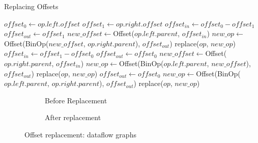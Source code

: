 \renewcommand\theFancyVerbLine{\arabic{FancyVerbLine}}
\begin{algorithm}[H]
\caption{Replacing Offsets}\label{optimisation.replacing_offset}
\begin{algorithmic}[1]
\State $offset_0 \gets op.left.offset$
\State $offset_1 \gets op.right.offset$
\State $offset_{in} \gets offset_0 - offset_1$
\State $offset_{out} \gets offset_1$
\State $new\_offset \gets $Offset($op.left.parent$, $offset_{in}$)
\State $new\_op \gets $Offset(BinOp($new\_offset$, $op.right.parent$), $offset_{out}$)
\State replace($op$, $new\_op$)
\State $offset_{in} \gets offset_1 - offset_0$
\State $offset_{out} \gets offset_0$
\State $new\_offset \gets $Offset($op.right.parent$, $offset_{in}$)
\State $new\_op \gets $Offset(BinOp($op.left.parent$, $new\_offset$), $offset_{out}$)
\State replace($op$, $new\_op$)
\Else
\State $offset_{out} \gets offset_0$
\State $new\_op \gets $Offset(BinOp($op.left.parent$, $op.right.parent$), $offset_{out}$)
\State replace($op$, $new\_op$)
\EndIf
\EndFunction
\end{algorithmic}
\end{algorithm}

\begin{figure}[h]
  \centering
  \begin{subfigure}[t]{0.5\textwidth}\centering
    \caption{Before Replacement}
  \end{subfigure}%
  \begin{subfigure}[t]{0.5\textwidth}\centering
    \caption{After replacement}
  \end{subfigure}
  \caption{Offset replacement: dataflow graphs}\label{dataflow.offset_rename}
\end{figure}

